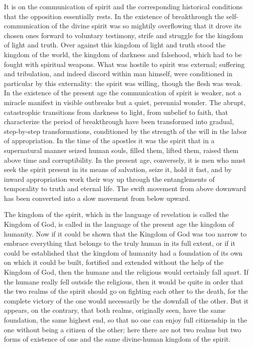 \documentclass[12pt,a4paper,openany]{book}
\newcommand{\opage}[1]{\marginnote{\footnotesize\textit{[#1]}}}
\begin{document}
It is on the communication of spirit and the corresponding historical
conditions that the opposition essentially rests. In the existence of
breakthrough the self-communication of the divine spirit was so mightily
overflowing that it drove its chosen ones forward to voluntary testimony,
strife and struggle for the kingdom of light and truth. Over against this
kingdom of light and truth stood the kingdom of the world, the kingdom of
darkness and falsehood, which had to be fought with spiritual weapons.
What was hostile to spirit was external; suffering and tribulation, and
indeed discord within man himself, were conditioned in particular by this
externality: the spirit was willing, though the flesh was weak. In the
existence of the present age the communication of spirit is weaker, not a
miracle manifest in visible outbreaks but a quiet, perennial wonder. The
abrupt, catastrophic transitions from darkness to light, from unbelief to
faith, that characterize the period of breakthrough have been transformed
into gradual, step-by-step transformations, conditioned by the strength of
the will in the labor of appropriation. In the time of the apostles it was
the spirit that in a supernatural manner seized human souls, filled them,
lifted them, raised them above time and corruptibility. \opage{98}In the present
age, conversely, it is men who must seek the spirit present in its means
of salvation, seize it, hold it fast, and by inward appropriation work
their way up through the entanglements of temporality to truth and
eternal life. The swift movement from above downward has been converted
into a slow movement from below upward.

The kingdom of the spirit, which in the language of revelation is called
the Kingdom of God, is called in the language of the present age the
kingdom of humanity. Now if it could be shown that the Kingdom of God was
too narrow to embrace everything that belongs to the truly human in its
full extent, or if it could be established that the kingdom of humanity
had a foundation of its own on which it could be built, fortified and
extended without the help of the Kingdom of God, then the humane and the
religious would certainly fall apart. If the humane really fell outside
the religious, then it would be quite in order that the two realms of the
spirit should go on fighting each other to the death, for the complete
victory of the one would necessarily be the downfall of the other. But it
appears, on the contrary, that both realms, originally seen, have the
same foundation, the same highest end, so that no one can enjoy full
citizenship in the one without being a citizen of the other; here there
are not two realms but two forms of existence of one and the same
divine-human kingdom of the spirit.
\end{document}
